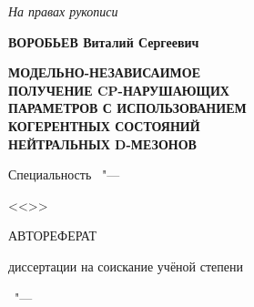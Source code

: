 \thispagestyle{empty}

\vspace{0pt plus1fill} %
\begin{flushright}
  \large{\textit{На правах рукописи}}
\end{flushright}

\vspace{0pt plus3fill} %
\begin{center}
\textbf {\large \MakeUppercase{Воробьев} Виталий Сергеевич}
\end{center}

\vspace{0pt plus3fill} %
\begin{center}
  \textbf{\Large \MakeUppercase{Модельно-независаимое}} \\
  \textbf{\Large \MakeUppercase{получение CP-нарушающих}} \\
  \textbf{\Large \MakeUppercase{параметров с использованием}} \\
  \textbf{\Large \MakeUppercase{когерентных состояний}} \\
  \textbf{\Large \MakeUppercase{нейтральных D-мезонов}}

\vspace{0pt plus3fill} %
{\large Специальность \thesisSpecialtyNumber\ "---\par <<\thesisSpecialtyTitle>>}

\vspace{0pt plus1.5fill} %
{\Large\MakeUppercase{Автореферат}}\par
\large{диссертации на соискание учёной степени\par \thesisDegree}
\end{center}

\vspace{0pt plus4fill} %
\begin{center}
{\large{\thesisCity\ "--- \thesisYear}}
\end{center}

